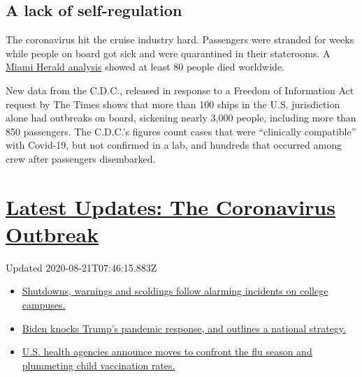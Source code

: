 \hypertarget{a-lack-of-self-regulation}{%
\subsection{A lack of self-regulation}\label{a-lack-of-self-regulation}}

The coronavirus hit the cruise industry hard. Passengers were stranded
for weeks while people on board got sick and were quarantined in their
staterooms. A
\href{https://www.miamiherald.com/news/business/tourism-cruises/article241914096.html}{Miami
Herald analysis} showed at least 80 people died worldwide.

New data from the C.D.C., released in response to a Freedom of
Information Act request by The Times shows that more than 100 ships in
the U.S. jurisdiction alone had outbreaks on board, sickening nearly
3,000 people, including more than 850 passengers. The C.D.C.'s figures
count cases that were ``clinically compatible'' with Covid-19, but not
confirmed in a lab, and hundreds that occurred among crew after
passengers disembarked.

\hypertarget{latest-updates-the-coronavirus-outbreak}{%
\section{\texorpdfstring{\href{https://www.nytimes3xbfgragh.onion/2020/08/20/world/coronavirus-covid.html?action=click\&pgtype=Article\&state=default\&region=MAIN_CONTENT_1\&context=storylines_live_updates}{Latest
Updates: The Coronavirus
Outbreak}}{Latest Updates: The Coronavirus Outbreak}}\label{latest-updates-the-coronavirus-outbreak}}

Updated 2020-08-21T07:46:15.883Z

\begin{itemize}
\tightlist
\item
  \href{https://www.nytimes3xbfgragh.onion/2020/08/20/world/coronavirus-covid.html?action=click\&pgtype=Article\&state=default\&region=MAIN_CONTENT_1\&context=storylines_live_updates\#link-68774d88}{Shutdowns,
  warnings and scoldings follow alarming incidents on college campuses.}
\item
  \href{https://www.nytimes3xbfgragh.onion/2020/08/20/world/coronavirus-covid.html?action=click\&pgtype=Article\&state=default\&region=MAIN_CONTENT_1\&context=storylines_live_updates\#link-26b58724}{Biden
  knocks Trump's pandemic response, and outlines a national strategy.}
\item
  \href{https://www.nytimes3xbfgragh.onion/2020/08/20/world/coronavirus-covid.html?action=click\&pgtype=Article\&state=default\&region=MAIN_CONTENT_1\&context=storylines_live_updates\#link-4e542da3}{U.S.
  health agencies announce moves to confront the flu season and
  plummeting child vaccination rates.}
\end{itemize}

